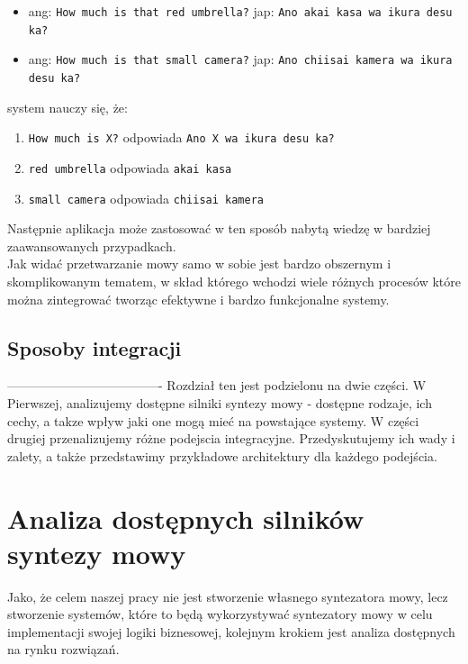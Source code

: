  \begin{itemize}
	\item ang: \verb"How much is that red umbrella?" jap: \verb"Ano akai kasa wa ikura desu ka?"
	\item ang: \verb"How much is that small camera?" jap: \verb"Ano chiisai kamera wa ikura desu ka?"
\end{itemize} 
system nauczy się, że:
 \begin{enumerate}
	\item \verb"How much is X?" odpowiada \verb"Ano X wa ikura desu ka?"
	\item \verb"red umbrella" odpowiada \verb"akai kasa"
	\item \verb"small camera" odpowiada \verb"chiisai kamera"
\end{enumerate} 
Następnie aplikacja może zastosować w ten sposób nabytą wiedzę w bardziej zaawansowanych przypadkach.
\\ Jak widać przetwarzanie mowy samo w sobie jest bardzo obszernym i skomplikowanym tematem, w skład którego wchodzi wiele różnych procesów które można zintegrować tworząc efektywne i bardzo funkcjonalne systemy.


\subsection{Sposoby integracji}

-------------------------------------%
Rozdział ten jest podzielonu na dwie części. W Pierwszej, analizujemy dostępne silniki syntezy mowy - dostępne rodzaje, ich cechy, a takze wpływ jaki one mogą mieć na powstające systemy. W części drugiej przenalizujemy różne podejscia integracyjne. Przedyskutujemy ich wady i zalety, a także przedstawimy przykładowe architektury dla każdego podejścia. 

\section {Analiza dostępnych silników syntezy mowy}

Jako, że celem naszej pracy nie jest stworzenie własnego syntezatora mowy, lecz stworzenie systemów, które to będą wykorzystywać syntezatory mowy w celu implementacji swojej logiki biznesowej, kolejnym krokiem jest analiza dostępnych na rynku rozwiązań. 

